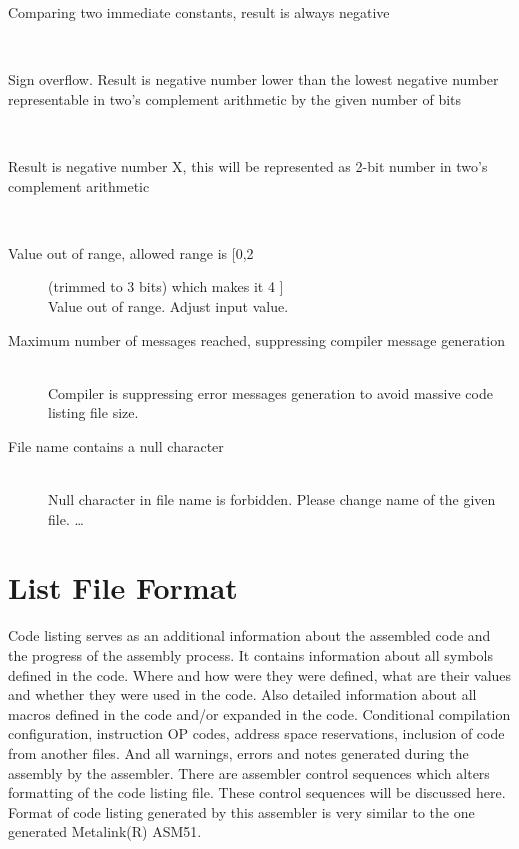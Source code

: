 {\begin{description}
                    \item[Comparing two immediate constants, result is always negative] \hfill \\

                    \item[Sign overflow. Result is negative number lower than the lowest negative number representable in two's complement arithmetic by the given number of bits ] \hfill \\

                    \item[Result is negative number X, this will be represented as 2-bit number in two's complement arithmetic] \hfill \\

                    \item[Value out of range, allowed range is [0,2] (trimmed to 3 bits) which makes it 4 ] \hfill \\
                    Value out of range. Adjust input value.                                                     %
                    \item[Maximum number of messages reached, suppressing compiler message generation ] \hfill \\
                    Compiler is suppressing error messages generation to avoid massive code listing file size.
                    \item[File name contains a null character ] \hfill \\
                    Null character in file name is forbidden. Please change name of the given file.
                    \ldots
                    \end{description}

        \section{List File Format}
                Code listing serves as an additional information about the assembled code and the progress of the assembly process. It contains information about all symbols defined in the code. Where and how were they were defined, what are their values and whether they were used in the code. Also detailed information about all macros defined in the code and/or expanded in the code. Conditional compilation configuration, instruction OP codes, address space reservations, inclusion of code from another files. And all warnings, errors and notes generated during the assembly by the assembler. There are assembler control sequences which alters formatting of the code listing file. These control sequences will be discussed here. Format of code listing generated by this assembler is very similar to the one generated Metalink(R) ASM51.
                \begin{code}[h]


\end{code}}
